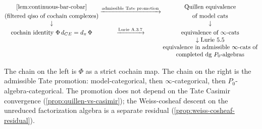 \begin{equation*}
  \begin{array}{@{}c@{\;}c@{\;}c@{}}
    \begin{gathered}
      \alpharef\\
      \text{(filtered qiso of cochain complexes)}
    \end{gathered}
    &
    \xrightarrow{\text{admissible Tate promotion}} &
    \begin{gathered}
      \text{Quillen equivalence}\\
      \text{of model cats}
    \end{gathered} \\
    \downarrow & & \downarrow \\
    \text{cochain identity }\Phi\,d_{\mathrm{CE}}=d_\pi\,\Phi &
    \xrightarrow{\text{Lurie A.3.7}} &
    \text{equivalence of }\infty\text{-cats}\\
    & & \downarrow\text{Lurie 5.5} \\
    & &
    \text{equivalence in admissible }\infty\text{-cats of}\\
    & & \text{completed dg }P_0\text{-algebras}
  \end{array}
\end{equation*}

The chain on the left is $\Phi$ as a strict cochain map.
The chain on the right is the admissible Tate promotion: model-categorical,
then $\infty$-categorical, then $P_0$-algebra-categorical.
The promotion does not depend on the Tate Casimir convergence
(\ref{prop:quillen-vs-casimir}); the Weiss-cosheaf descent on the
unreduced factorization algebra is a separate residual
(\ref{prop:weiss-cosheaf-residual}).
